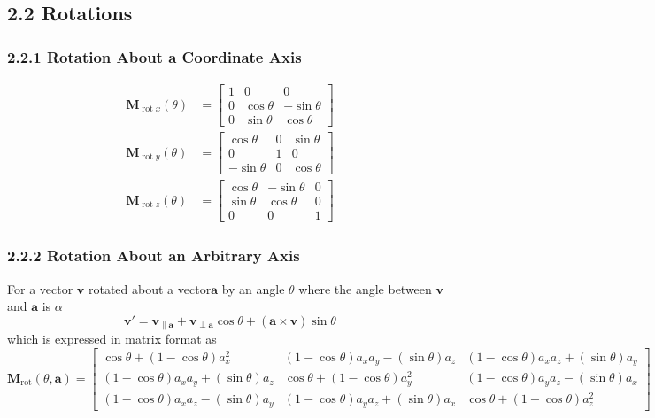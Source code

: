 \documentclass[11pt]{article}
\newcommand{\bm}[1]{\mathbf{#1}}
\DeclareMathOperator{\rot}{rot}
\begin{document}
\subsection*{2.2 Rotations}
\subsubsection*{2.2.1 Rotation About a Coordinate Axis}
\begin{align}
    \bm{M}_{\rot x} \left(\theta\right) &= \begin{bmatrix}
        1 & 0 & 0 \\
        0 & \cos \theta & -\sin \theta \\
        0 & \sin \theta & \cos \theta
    \end{bmatrix} \\
    \bm{M}_{\rot y} \left(\theta\right) &= \begin{bmatrix}
        \cos \theta & 0 & \sin \theta \\
        0 & 1 & 0 \\
        -\sin \theta & 0 & \cos \theta
    \end{bmatrix} \\
    \bm{M}_{\rot z} \left(\theta\right) &= \begin{bmatrix}
        \cos \theta & -\sin \theta & 0\\
        \sin \theta & \cos \theta & 0\\
        0 & 0 & 1
    \end{bmatrix}
\end{align}

\subsubsection*{2.2.2 Rotation About an Arbitrary Axis}
For a vector $\bm{v}$ rotated about a vector$\bm{a}$ by an angle $\theta$ where the angle
between $\bm{v}$ and $\bm{a}$ is $\alpha$
\begin{equation}
    \bm{v}' = \bm{v}_{\parallel \bm{a}} + \bm{v}_{\perp \bm{a}} \cos \theta
        + \left( \bm{a} \times \bm{v} \right) \sin \theta
\end{equation}
which is expressed in matrix format as
\begin{equation}
    \bm{M}_{\rot} \left(\theta, \bm{a}\right) = \begin{bmatrix}
        \cos\theta + (1 - \cos\theta) a_x^2 & (1 - \cos\theta) a_xa_y - (\sin\theta) a_z & (1 - \cos\theta) a_xa_z + (\sin\theta)a_y \\
        (1 - \cos\theta) a_xa_y + (\sin\theta) a_z & \cos\theta + (1 - \cos\theta) a_y^2 & (1 - \cos\theta) a_ya_z - (\sin\theta)a_x \\
        (1 - \cos\theta) a_xa_z - (\sin\theta) a_y & (1 - \cos\theta) a_ya_z + (\sin\theta) a_x & \cos\theta + (1 - \cos\theta) a_z^2
    \end{bmatrix}
\end{equation}
\end{document}
